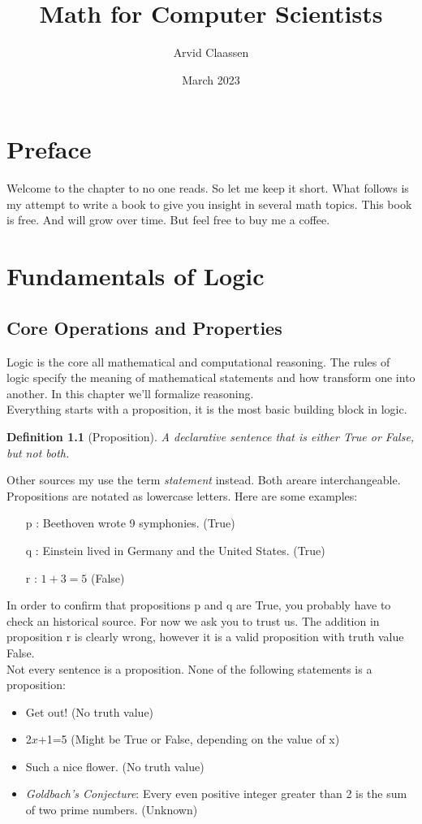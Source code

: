 \documentclass[10pt,a4paper,draft,titlepage,onecolumn]{book}
\author{Arvid Claassen}
\date{March 2023}
\title{Math for Computer Scientists}
\newtheorem{definition}{Definition}[section]
\begin{document}
\maketitle
\tableofcontents
\chapter*{Preface}
Welcome to the chapter to no one reads. So let me keep it short.
What follows is my attempt to write a book to give you insight in several math topics.
This book is free. And will grow over time.
But feel free to buy me a coffee.


\chapter{Fundamentals of Logic}
\section{Core Operations and Properties}
Logic is the core all mathematical and computational reasoning. The rules of logic specify the meaning of mathematical statements and how transform one into another. 
In this chapter we'll formalize reasoning. \\
Everything starts with a proposition, it is the most basic building block in logic.
\begin{definition}[Proposition]
A declarative sentence that is either True or False, but not both.
\end{definition}
Other sources my use the term \textit{statement} instead. Both areare interchangeable. \\ 
Propositions are notated as lowercase letters. Here are some examples:
\begin{itemize}
 \item[p]: Beethoven wrote 9 symphonies. (True)
 \item[q]: Einstein lived in Germany and the United States. (True)
 \item[r]: $ 1 + 3 = 5 $ (False)
\end{itemize}
In order to confirm that propositions p and q are True, you probably have to check an historical source. For now we ask you to trust us.
The addition in proposition r is clearly wrong, however it is a valid proposition with truth value False. \\
Not every sentence is a proposition. None of the following statements is a proposition:
\begin{itemize}
 \item  Get out! (No truth value)
 \item  2{$x$}+1=5 (Might be True or False, depending on the value of x)
 \item  Such a nice flower. (No truth value)
 \item  \textit{Goldbach’s Conjecture}: Every even positive integer greater than 2 is the sum of two prime numbers. (Unknown)
\end{itemize}
\end{document}
